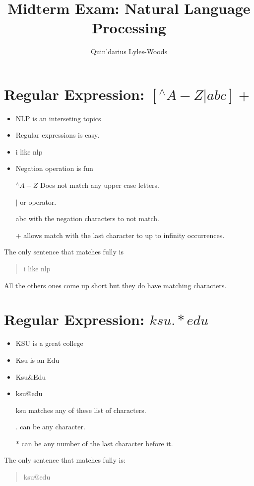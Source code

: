 \documentclass{article}
\title{Midterm Exam: Natural Language Processing}
\author{Quin'darius Lyles-Woods}
\begin{document}
\maketitle
\section{Regular Expression: \([^\wedge A-Z|abc]+\) }
\begin{itemize}
	\item NLP is an interseting topics
	\item Regular expressions is easy.
	\item i like nlp
	\item Negation operation is fun
\end{itemize}
\begin{itemize}
	\item [\(^\wedge A-Z\)] Does not match any upper case letters.
	\item [\(|\)] or operator.
	\item [abc] with the negation characters to not match.
	\item [+] allows match with the last character to up to infinity occurrences.
\end{itemize}
The only sentence that matches fully is 
\begin{quote}
	i like nlp
\end{quote}
All the others ones come up short but they do have matching characters.
\section{Regular Expression: \(ksu.*edu\)}
\begin{itemize}
	\item KSU is a great college
	\item Ksu is an Edu
	\item Ksu\&Edu
	\item ksu@edu
\end{itemize}
\begin{itemize}
	\item 	[ksu] matches any of these list of characters.
	\item 	[.] can be any character.
	\item 	[*] can be any number of the last character before it.
\end{itemize}
The only sentence that matches fully is: 
\begin{quote}
	ksu@edu
\end{quote}
\end{document}
